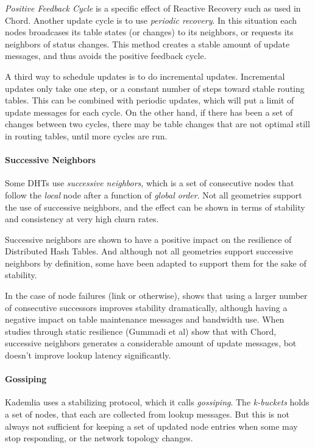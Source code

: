 \emph{Positive Feedback Cycle} is a specific effect of Reactive Recovery such as used in
 Chord\cite{rhea-04-handling-churn}. Another update cycle is to use \emph{periodic recovery}.
 In this situation each nodes broadcases its table states (or changes) to its neighbors,
 or requests its neighbors of status changes. This method creates a stable amount
 of update messages, and thus avoids the positive feedback cycle.

A third way to schedule updates is to do incremental updates. Incremental updates only
 take one step, or a constant number of steps toward stable routing tables.
 This can be combined with periodic updates, which will put a limit of update messages
 for each cycle. On the other hand, if there has been a set of changes
 between two cycles, there may be
 table changes that are not optimal still in routing tables, until more cycles are run.

\paragraph{Successive Neighbors}
Some DHTs use \emph{successive neighbors}, which is a set of consecutive nodes that
 follow the \emph{local} node after a function of \emph{global order}.
 Not all geometries support the use of successive neighbors, and the effect
 can be shown in terms of stability and consistency at very high churn
 rates\cite{gummadi-03-impact-geometry}.

Successive neighbors are shown to have a positive impact on the resilience of
 Distributed Hash Tables. And although not all geometries support successive neighbors
 by definition, some have been adapted to support them for the sake of stability.

In the case of node failures (link or otherwise)\cite{li-04-comparing-performance},
 shows that using a larger number of consecutive successors improves stability
 dramatically, although having a negative impact on table maintenance messages and
 bandwidth use. When studies through static resilience (Gummadi et
 al\cite{gummadi-03-impact-geometry}) show that with Chord, successive neighbors generates
 a considerable amount of update messages, bot doesn't improve lookup latency
 significantly.

\paragraph{Gossiping}
Kademlia uses a  stabilizing protocol, which it calls \emph{gossiping}.
 The \emph{k-buckets} holds a set of nodes, that each are collected from lookup messages.
 But this is not always not sufficient for keeping a set of updated node entries when
 some may stop responding, or the network topology changes.

